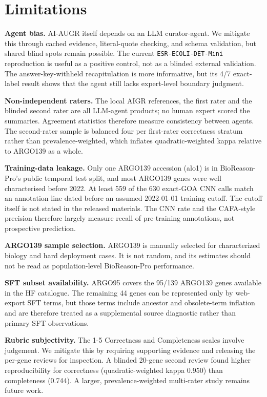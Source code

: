 \documentclass[
  11pt,
]{article}
\begin{document}
\hypertarget{limitations}{%
\section{Limitations}\label{limitations}}

\textbf{Agent bias.} AI-AUGR itself depends on an LLM curator-agent. We
mitigate this through cached evidence, literal-quote checking, and
schema validation, but shared blind spots remain possible. The current
\texttt{ESR-ECOLI-DET-Mini} reproduction is useful as a positive
control, not as a blinded external validation. The answer-key-withheld
recapitulation is more informative, but its 4/7 exact-label result shows
that the agent still lacks expert-level boundary judgment.

\textbf{Non-independent raters.} The local AIGR references, the first
rater and the blinded second rater are all LLM-agent products; no human
expert scored the summaries. Agreement statistics therefore measure
consistency between agents. The second-rater sample is balanced four per
first-rater correctness stratum rather than prevalence-weighted, which
inflates quadratic-weighted kappa relative to ARGO139 as a whole.

\textbf{Training-data leakage.} Only one ARGO139 accession (alo1) is in
BioReason-Pro's public temporal test split, and most ARGO139 genes were well
characterised before 2022. At least 559 of the 630 exact-GOA CNN calls match
an annotation line dated before an assumed 2022-01-01 training cutoff. The
cutoff itself is not stated in the released materials. The CNN rate and the
CAFA-style precision therefore largely measure recall of pre-training
annotations, not prospective prediction.

\textbf{ARGO139 sample selection.} ARGO139 is manually selected for
characterized biology and hard deployment cases. It is not random, and
its estimates should not be read as population-level BioReason-Pro
performance.

\textbf{SFT subset availability.} ARGO95 covers the 95/139 ARGO139 genes
available in the HF catalogue. The remaining 44 genes can be represented
only by web-export SFT terms, but those terms include ancestor and
obsolete-term inflation and are therefore treated as a supplemental
source diagnostic rather than primary SFT observations.

\textbf{Rubric subjectivity.} The 1-5 Correctness and Completeness
scales involve judgement. We mitigate this by requiring supporting
evidence and releasing the per-gene reviews for inspection. A blinded
20-gene second review found higher reproducibility for correctness
(quadratic-weighted kappa 0.950) than completeness (0.744). A larger,
prevalence-weighted multi-rater study remains future work.
\end{document}
